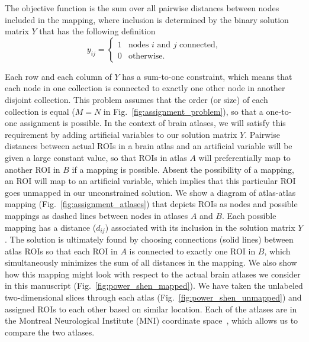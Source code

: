 \documentclass[10pt,letterpaper]{article}\usepackage[]{graphicx}\usepackage[]{color}
\begin{document}
\vspace{0.25cm}

The objective function is the sum over all pairwise distances between nodes included in the mapping, where inclusion is determined by the binary solution matrix $Y$ that has the following definition
%
\begin{equation}\label{eq:assignment_sol}
y_{ij}=\begin{cases}
1 & \text{nodes } i \text{ and } j \text{ connected,} \\
0 & \text{otherwise.}
\end{cases}
\end{equation}

Each row and each column of $Y$ has a sum-to-one constraint, which means that each node in one collection is connected to exactly one other node in another disjoint collection. This problem assumes that the order (or size) of each collection is equal ($M=N$ in Fig.~\ref{fig:assignment_problem}), so that a one-to-one assignment is possible. In the context of brain atlases, we will satisfy this requirement by adding artificial variables to our solution matrix $Y$. Pairwise distances between actual ROIs in a brain atlas and an artificial variable will be given a large constant value, so that ROIs in atlas $A$ will preferentially map to another ROI in $B$ if a mapping is possible. Absent the possibility of a mapping, an ROI will map to an artificial variable, which implies that this particular ROI goes unmapped in our unconstrained solution. We show a diagram of atlas-atlas mapping (Fig.~\ref{fig:assignment_atlases}) that depicts ROIs as nodes and possible mappings as dashed lines between nodes in atlases $A$ and $B$. Each possible mapping has a distance ($d_{ij}$) associated with its inclusion in the solution matrix $Y$. The solution is ultimately found by choosing connections (solid lines) between atlas ROIs so that each ROI in $A$ is connected to exactly one ROI in $B$, which simultaneously minimizes the sum of all distances in the mapping. We also show how this mapping might look with respect to the actual brain atlases we consider in this manuscript (Fig.~\ref{fig:power_shen_mapped}). We have taken the unlabeled two-dimensional slices through each atlas (Fig.~\ref{fig:power_shen_unmapped}) and assigned ROIs to each other based on similar location. Each of the atlases are in the Montreal Neurological Institute (MNI) coordinate space~\cite{collins1994}, which allows us to compare the two atlases.
\end{document}
